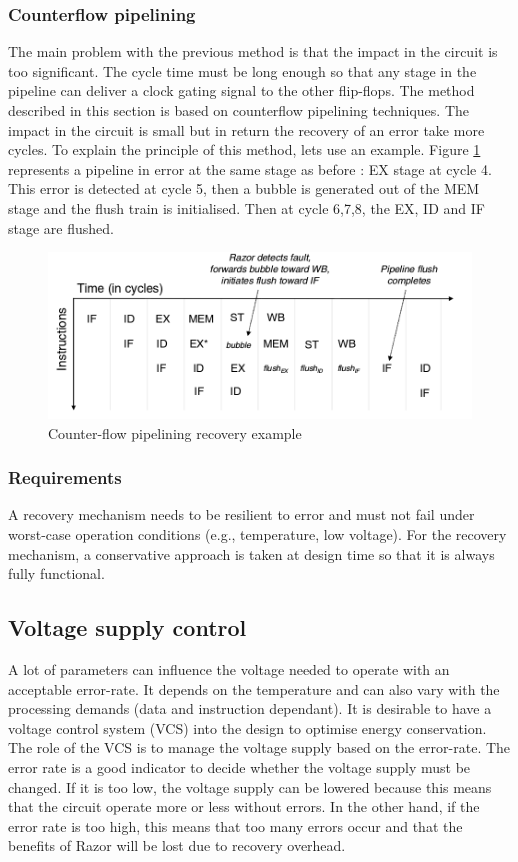 \documentclass[fleqn,envcountsame,runningheads,10pt,a4paper]{llncs}
\begin{document}
\subsubsection{Counterflow pipelining}
The main problem with the previous method is that the impact in the circuit is too significant. The cycle time must be long enough so that any stage in the pipeline can deliver a clock gating signal to the other flip-flops. The method described in this section is based on counterflow pipelining techniques\cite{Molnar:1994}. The impact in the circuit is small but in return the recovery of an error take more cycles. 
To explain the principle of this method, lets use an example. Figure
\ref{figure5} represents a pipeline in error at the same stage as before
: EX stage at cycle 4. This error is detected at cycle 5, then a bubble
is generated out of the MEM stage and the flush train is initialised. Then at cycle 6,7,8, the EX, ID and IF stage are flushed. 
\begin{figure}[!h]
    \centering
   \centerline{\includegraphics[scale=0.3]{./img/figure5.png}}
   \caption{\label{figure5}Counter-flow pipelining recovery example\cite{Barthou:1998}}
\end{figure}

\subsubsection{Requirements}
A recovery mechanism needs to be resilient to error and must not fail
under worst-case operation conditions (e.g., temperature, low voltage).
For the recovery mechanism, a conservative approach is taken at design
time so that it is always fully functional. 

\subsection{Voltage supply control}
\label{SVC}
A lot of parameters can influence the voltage needed to operate with an
acceptable error-rate. It depends on the temperature and can also vary
with the processing demands (data and instruction dependant). It is
desirable to have a voltage control system (VCS) into the design to
optimise energy conservation. The role of the VCS is to manage the
voltage supply based on the error-rate. The error rate is a good
indicator to decide whether the voltage supply must be changed. If it is
too low, the voltage supply can be lowered because this means that the
circuit operate more or less without errors. In the other hand, if the
error rate is too high, this means that too many errors occur and that
the benefits of Razor will be lost due to recovery overhead.
\end{document}
